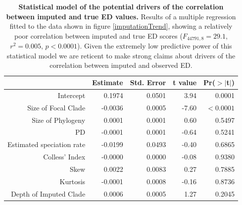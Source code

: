 \documentclass[10pt,english]{article}
\begin{document}
\begin{table}[ht] 
  \centering
  \begin{tabular}{rrrrr}
    \hline
    & Estimate & Std. Error & t value & Pr($>$$|$t$|$) \\
     \hline
     Intercept & 0.1974 & 0.0501 & 3.94 & 0.0001 \\
     Size of Focal Clade & -0.0036 & 0.0005 & -7.60 & $<0.0001$ \\
     Size of Phylogeny & 0.0001 & 0.0001 & 0.60 & 0.5497 \\
     PD & -0.0001 & 0.0001 & -0.64 & 0.5241 \\
     Estimated speciation rate & -0.0199 & 0.0493 & -0.40 & 0.6865 \\
     Colless' Index & -0.0000 & 0.0000 & -0.08 & 0.9380 \\
     Skew & 0.0022 & 0.0083 & 0.27 & 0.7885 \\
     Kurtosis & -0.0001 & 0.0008 & -0.16 & 0.8736 \\
     Depth of Imputed Clade & 0.0006 & 0.0005 & 1.27 & 0.2045 \\ \hline
  \end{tabular}
  \caption{\textbf{Statistical model of the potential drivers of the correlation
      between imputed and true ED values.} Results of a multiple regression
      fitted to the data shown in figure \ref{imputationTrend}, showing a
      relatively poor correlation between imputed and true ED scores
      ($F_{44791,8} = 29.1$, $r^{2} = 0.005$, $p < 0.0001$). Given the extremely
      low predictive power of this statistical model we are reticent to make
      strong claims about drivers of the correlation between imputed and
      observed ED. }
  \label{impute_reg}
\end{table}
\end{document}
